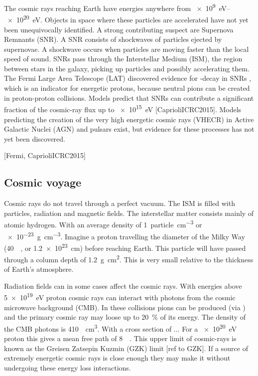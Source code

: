 The cosmic rays reaching Earth have energies anywhere from \SIrange{e9}{e20}{\eV}. Objects in space where these particles are accelerated have not yet been unequivocally identified. A strong contributing suspect are Supernova Remnants (SNR). A SNR consists of shockwaves of particles ejected by supernovae. A shockwave occurs when particles are moving faster than the local speed of sound. SNRs pass through the Interstellar Medium (ISM), the region between stars in the galaxy, picking up particles and possibly accelerating them. The Fermi Large Area Telescope (LAT) discovered evidence for \Pgpz-decay in SNRs \cite{ackermann2013snr}, which is an indicator for energetic protons, because neutral pions can be created in proton-proton collisions. Models predict that SNRs can contribute a significant fraction of the cosmic-ray flux up to \SI{e15}{\eV} [CaprioliICRC2015]. Models predicting the creation of the very high energetic cosmic rays (VHECR) in Active Galactic Nuclei (AGN) and pulsars exist, but evidence for these processes has not yet been discovered.

[Fermi, CaprioliICRC2015]

\subsection{Cosmic voyage}

Cosmic rays do not travel through a perfect vacuum. The ISM is filled with particles, radiation and magnetic fields. The interstellar matter consists mainly of atomic hydrogen. With an average density of \SI{1}{particle\per\centi\meter\cubed} or \SI{e-23}{\gram\per\centi\meter\cubed}. Imagine a proton travelling the diameter of the Milky Way (\SI{40}{\kilo\parsec}, or \SI{1.2e23}{\cm}) before reaching Earth. This particle will have passed through a column depth of \SI{1.2}{\gram\square\centi\meter}. This is very small relative to the thickness of Earth's atmosphere.

Radiation fields can in some cases affect the cosmic rays. With energies above \SI{5e19}{\eV} proton cosmic rays can interact with photons from the cosmic microwave background (CMB). In these collisions pions can be produced (via \PDelta) and the primary cosmic ray may loose up to \SI{20}{\percent} of its energy. The density of the CMB photons is \SI{410}{\per\centi\meter\cubed}. With a cross section of ... For a \SI{e20}{\eV} proton this gives a mean free path of \SI{8}{\mega\parsec}. This upper limit of cosmic-rays is known as the Greisen Zatsepin Kuzmin (GZK) limit [ref to GZK]. If a source of extremely energetic cosmic rays is close enough they may make it without undergoing these energy loss interactions.

